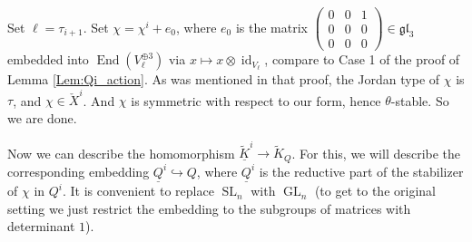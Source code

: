 \documentclass[12pt]{amsart}
\newcommand{\C}{\mathbb{C}}
\theoremstyle{definition}
\numberwithin{equation}{section}
\begin{document}
Set $\ell=\tau_{i+1}$. Set $\chi=\chi^i+e_0$, where $e_0$ is the matrix
$\begin{pmatrix}0&0&1\\0&0&0\\0&0&0\end{pmatrix}\in \mathfrak{gl}_3$ embedded
into $\operatorname{End}(V_{\ell}^{\oplus 3})$ via $x\mapsto x\otimes \operatorname{id}_{V_{\ell}}$,
compare to Case 1 of the proof of Lemma \ref{Lem:Qi_action}.
%
As was mentioned in that proof,
the Jordan type of $\chi$ is $\tau$, and $\chi\in \check{X}^i$.
And $\chi$ is symmetric with respect to our form, hence $\theta$-stable.
So we are done.

Now we can describe the homomorphism $\underline{\tilde{K}}^i\rightarrow \tilde{K}_Q$. For this, we will
describe the corresponding embedding $\underline{Q}^i\hookrightarrow Q$, where
$\underline{Q}^i$ is the reductive part of the stabilizer of $\chi$ in $Q^i$.
It is convenient to replace $\operatorname{SL}_n$ with $\operatorname{GL}_n$
(to get to the original setting we just restrict the embedding to the subgroups of matrices with determinant $1$).
\end{document}
